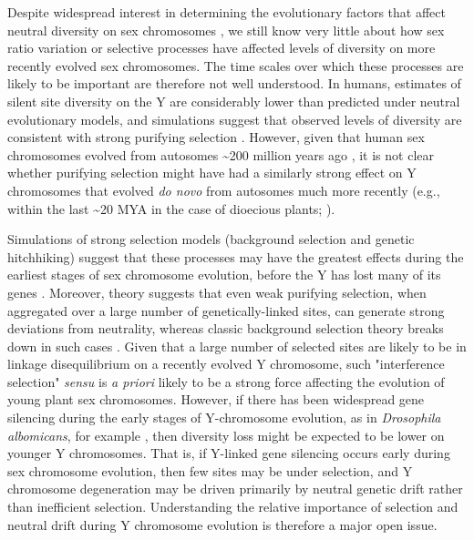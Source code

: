 \documentclass[9pt,twocolumn,twoside,lineno]{gsajnl}
\begin{document}
Despite widespread interest in determining the evolutionary factors that affect neutral diversity on sex chromosomes \citep{ellegren2011,bachtrog2013NRG}, we still know very little about how sex ratio variation or selective processes have affected levels of diversity on more recently evolved sex chromosomes. The time scales over which these processes are likely to be important are therefore not well understood. In humans, estimates of silent site diversity on the Y are considerably lower than predicted under neutral evolutionary models, and simulations suggest that observed levels of diversity are consistent with strong purifying selection \citep{Wilsonsayres2014}. However, given that human sex chromosomes evolved from autosomes \textasciitilde 200 million years ago \citep{lahn1999four,ross2005dna}, it is not clear whether purifying selection might have had a similarly strong effect on Y chromosomes that evolved \textit{do novo} from autosomes much more recently (e.g., within the last \textasciitilde 20 MYA in the case of dioecious plants; \citealt{charlesworth2015plant}).

Simulations of strong selection models (background selection and genetic hitchhiking) suggest that these processes may have the greatest effects during the earliest stages of sex chromosome evolution, before the Y has lost many of its genes \citep{bachtrog2008temporal}. Moreover, theory suggests that even weak purifying selection, when aggregated over a large number of genetically-linked sites, can generate strong deviations from neutrality, whereas classic background selection theory breaks down in such cases \citep{mcvean2000, comeron2002population, KaiserCharlesworth, good2014genetic}. Given that a large number of selected sites are likely to be in linkage disequilibrium on a recently evolved Y chromosome, such "interference selection" \textit{sensu} \citealt{good2014genetic} is \textit{a priori} likely to be a strong force affecting the evolution of young plant sex chromosomes. However, if there has been widespread gene silencing during the early stages of Y-chromosome evolution, as in \textit{Drosophila albomicans}, for example \citep{zhou2012chromosome}, then diversity loss might be expected to be lower on younger Y chromosomes. That is, if Y-linked gene silencing occurs early during sex chromosome evolution, then few sites may be under selection, and Y chromosome degeneration may be driven primarily by neutral genetic drift rather than inefficient selection. Understanding the relative importance of selection and neutral drift during Y chromosome evolution is therefore a major open issue.
\end{document}
